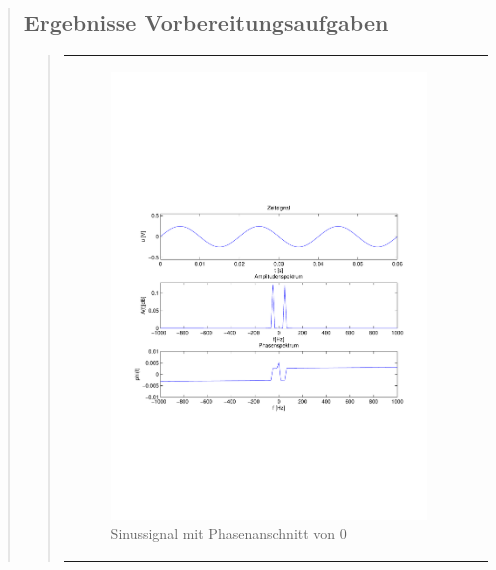 \begin{quote}
    \subsection{Ergebnisse Vorbereitungsaufgaben}
    \begin{quote}
            \begin{center}
            \begin{tabular}{ll}

            \hspace{-11em}
                \begin{minipage}{0.6\textwidth}

                    \begin{figure}[H]
                        \label{fig:}
                        \includegraphics[scale=0.5, trim = 2cm 7cm 1.5cm 8.5cm, clip]{./Bilder/Phasenanschnitt08pi.pdf}
                        \caption{Sinussignal mit Phasenanschnitt von $0$}
                    \end{figure}


\end{minipage}
\end{tabular}
\end{center}
\end{quote}
\end{quote}
